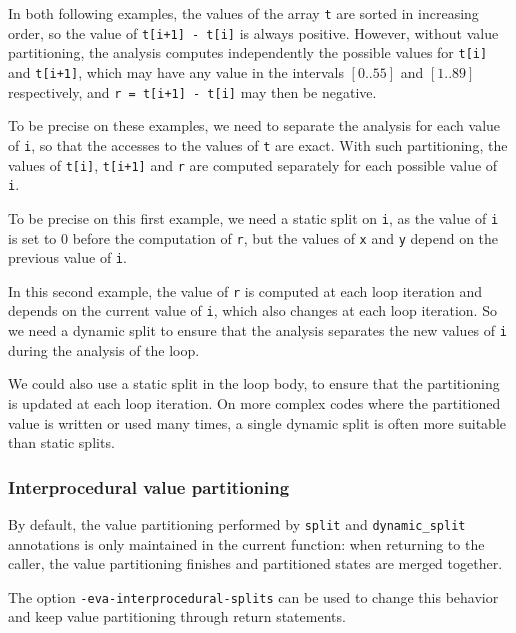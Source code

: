 \documentclass{frama-c-book}
\begin{document}
In both following examples, the values of the array \lstinline|t| are sorted in
increasing order, so the value of \lstinline|t[i+1] - t[i]| is always positive.
However, without value partitioning, the analysis computes independently the
possible values for \lstinline|t[i]| and \lstinline|t[i+1]|, which may have
any value in the intervals $[0..55]$ and $[1..89]$ respectively,
and \lstinline|r = t[i+1] - t[i]| may then be negative.

To be precise on these examples, we need to separate the analysis for each value
of \lstinline|i|, so that the accesses to the values of \lstinline|t| are exact.
With such partitioning, the values of \lstinline|t[i]|, \lstinline|t[i+1]| and
\lstinline|r| are computed separately for each possible value of \lstinline|i|.


To be precise on this first example, we need a static split on \lstinline|i|, as
the value of \lstinline|i| is set to 0 before the computation of \lstinline|r|,
but the values of \lstinline|x| and \lstinline|y| depend on the previous value
of \lstinline|i|.


In this second example, the value of \lstinline|r| is computed at each
loop iteration and depends on the current value of \lstinline|i|, which
also changes at each loop iteration.
So we need a dynamic split to ensure that the analysis separates the new
values of \lstinline|i| during the analysis of the loop.

We could also use a static split in the loop body, to ensure that the
partitioning is updated at each loop iteration. On more complex codes where
the partitioned value is written or used many times, a single dynamic split
is often more suitable than static splits.



\subsubsection{Interprocedural value partitioning}

By default, the value partitioning performed by \lstinline|split|
and \lstinline|dynamic_split| annotations is only maintained in the current
function: when returning to the caller, the value partitioning
finishes and partitioned states are merged together.

The option \lstinline|-eva-interprocedural-splits| can be used to change this
behavior and keep value partitioning through return statements.
\end{document}
